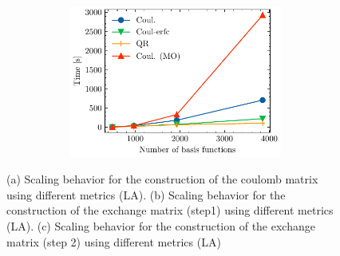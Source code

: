 \begin{figure}[htp]
\begin{subfigure}{\textwidth}
\begin{subfigure}{0.45\textwidth}
\centering
\includegraphics[width=\textwidth]{Pics/hfK2_alkan}
\end{subfigure}
\hfill
\begin{subtable}{0.45\textwidth}
\centering
{}
\end{subtable}
\caption{}
\label{fig:GS_DFK2SCALE_LA}
\end{subfigure}
\caption[Scaling behavior of the J and K kernels for LA.]{(a) Scaling behavior for the construction of the coulomb matrix using different metrics (LA). (b) Scaling behavior for the construction of the exchange matrix (step1) using different metrics (LA). (c) Scaling behavior for the construction of the exchange matrix (step 2) using different metrics (LA)}
\end{figure}


